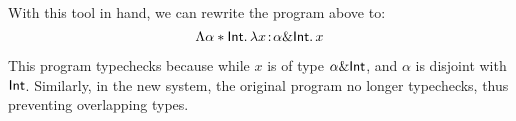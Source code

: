With this tool in hand, we can rewrite the program above to:
\[
\Lambda \alpha * \textsf{Int}.\, \lambda x \!:\! \alpha \& \textsf{Int}.\, x
\]

This program typechecks because while $x$ is of type $\alpha \& \textsf{Int}$,
and $\alpha$ is disjoint with $\textsf{Int}$. Similarly, in the new system,
the original program no longer typechecks, thus preventing overlapping types.
